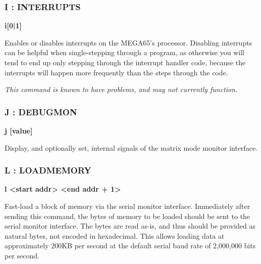 \subsubsection{I : INTERRUPTS}
\begin{description}[leftmargin=2cm,style=nextline]
\item [Format:] {\bf i[0|1]}
\item [Usage:] Enables or disables interrupts on the MEGA65's
  processor. Disabling interrupts can be helpful when single-stepping
  through a program, as otherwise you will tend to end up only
  stepping through the interrupt handler code, because the interrupts
  will happen more frequently than the steps through the code.

\item [Remarks:] {\em This command is known to have problems, and may
  not currently function.}

\end{description}

\subsubsection{J : DEBUGMON}
\begin{description}[leftmargin=2cm,style=nextline]
\item [Format:] {\bf j [value]}
\item [Usage:] Display, and optionally set, internal signals of the matrix
  mode monitor interface.

\end{description}


\subsubsection{L : LOADMEMORY}
\begin{description}[leftmargin=2cm,style=nextline]
\item [Format:] {\bf l <start addr> <end addr + 1>}
\item [Usage:] Fast-load a block of memory via the serial monitor
  interface.  Immediately after sending this command, the bytes of
  memory to be loaded should be sent to the serial monitor interface.
  The bytes are read as-is, and thus should be provided as natural
  bytes, not encoded in hexadecimal.  This allows loading data at
  approximately 200KB per second at the default serial baud rate
  of 2,000,000 bits per second.

\end{description}

